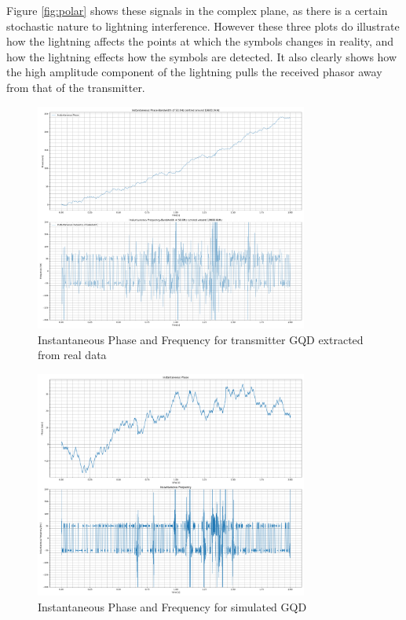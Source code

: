 Figure \ref{fig:polar} shows these signals in the complex plane, as there is a certain stochastic nature to lightning interference. However these three plots do illustrate how the lightning affects the points at which the symbols changes in reality, and how the lightning effects how the symbols are detected. It also clearly shows how the high amplitude component of the lightning pulls the received phasor away from that of the transmitter.


\begin{figure}[h!]
    \centering
    \includegraphics[width=0.8\textwidth]{figs/sim/veri/GQDver.png}
    \caption{\centering Instantaneous Phase and Frequency for transmitter GQD extracted from real data}
    \label{fig:AnthornDemod}
\end{figure}
\begin{figure}[h!]
    \centering
    \includegraphics[width = 0.8\textwidth]{figs/sim/veri/GQDfreq.png}
    \caption{\centering Instantaneous Phase and Frequency for simulated GQD}
    \label{fig:fullsimDemod}
\end{figure}
